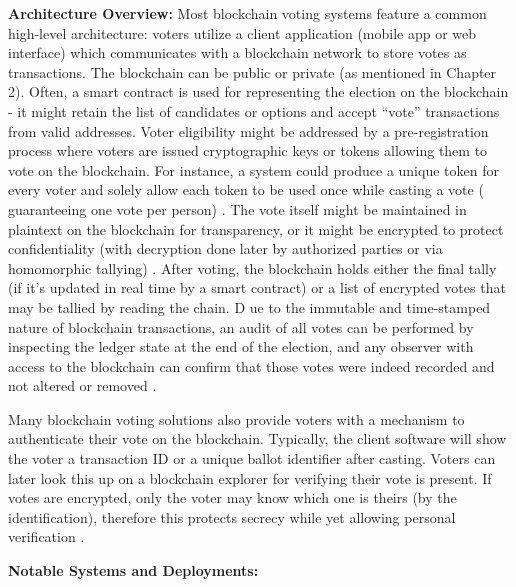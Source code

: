 \documentclass[a4paper,10pt]{report}
\begin{document}
\textbf {Architecture Overview:}  Most blockchain voting systems feature a common high-level architecture: voters utilize a client application (mobile app or web interface) which communicates with a blockchain network to store votes as transactions.  The blockchain can be public or private (as mentioned in Chapter 2).  Often, a smart contract is used for representing the election on the blockchain - it might retain the list of candidates or options and accept “vote” transactions from valid addresses.  Voter eligibility might be addressed by a pre-registration process where voters are issued cryptographic keys or tokens allowing them to vote on the blockchain.  For instance, a system could produce a unique token for every voter and solely allow each token to be used once while casting a vote ( guaranteeing one vote per person) \cite{narayanan2016bitcoin}.  The vote itself might be maintained in plaintext on the blockchain for transparency, or it might be encrypted to protect confidentiality (with decryption done later by authorized parties or via homomorphic tallying) \cite{bonneau2015sok}.  After voting, the blockchain holds either the final tally (if it’s updated in real time by a smart contract) or a list of encrypted votes that may be tallied by reading the chain. D ue to the immutable and time-stamped nature of blockchain transactions, an audit of all votes can be performed by inspecting the ledger state at the end of the election, and any observer with access to the blockchain can confirm that those votes were indeed recorded and not altered or removed \cite{zhang2019blockchain}.

 Many blockchain voting solutions also provide voters with a mechanism to authenticate their vote on the blockchain.  Typically, the client software will show the voter a transaction ID or a unique ballot identifier after casting.  Voters can later look this up on a blockchain explorer for verifying their vote is present.  If votes are encrypted, only the voter may know which one is theirs (by the identification), therefore this protects secrecy while yet allowing personal verification \cite{bonneau2015sok,chaum2004secret}.

\textbf{Notable Systems and Deployments:}
\end{document}
